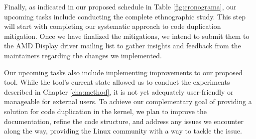 

Finally, as indicated in our proposed schedule in Table \ref{fig:cronograma}, 
our upcoming tasks include conducting the complete ethnographic study.
This step will start with completing our systematic approach to code 
duplication mitigation. Once we have finalized the mitigations, we intend 
to submit them to the AMD Display driver mailing list to gather insights 
and feedback from the maintainers regarding the changes we implemented.

Our upcoming tasks also include implementing improvements to our proposed tool. 
While the tool’s current state allowed us to conduct the experiments described in 
Chapter \ref{cha:method},
it is not yet adequately user-friendly or manageable for external users. 
To achieve our complementary goal of providing a solution for code duplication 
in the kernel, we plan to improve the documentation, refine the code structure, 
and address any issues we encounter along the way, providing the Linux community 
with a way to tackle the issue.
